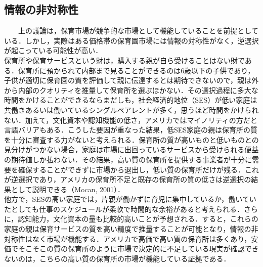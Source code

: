 \documentclass[
]{ltjarticle}
\begin{document}
\hypertarget{ux60c5ux5831ux306eux975eux5bfeux79f0ux6027}{%
\subsection{情報の非対称性}\label{ux60c5ux5831ux306eux975eux5bfeux79f0ux6027}}

~~~~上の議論は，保育市場が競争的な市場として機能していることを前提としている．しかし，実際はある価格帯の保育園市場には情報の対称性がなく，逆選択が起こっている可能性が高い．\\
\hspace*{0.333em}\hspace*{0.333em}\hspace*{0.333em}\hspace*{0.333em}保育所や保育サービスという財は，購入する親が自ら受けることはない財である．保育所に預かられて内部まで見ることができるのは6歳以下の子供であり，子供が適切に保育園の質を評価して親に伝達するとは期待できないので，親は外から内部のクオリティを推量して保育所を選ぶほかない．その選択過程に多大な時間をかけることができるならまだしも，社会経済的地位（SES）が低い家庭は共働きあるいは働いているシングルペアレントが多く，思うほど時間をかけられない．加えて，文化資本や認知機能の低さ，アメリカではマイノリティの方だと言語バリアもある．こうした要因が重なった結果，低SES家庭の親は保育所の質を十分に審査する力がないと考えられる．保育所の質が高いものと低いものとの見分けがつかない場合，家庭は市場に出回っているサービスから受けられる便益の期待値しか払わない．その結果，高い質の保育所を提供する事業者が十分に需要を確保することができずに市場から退出し，低い質の保育所だけが残る．これが逆選択であり，アメリカの保育所不足と既存の保育所の質の低さは逆選択の結果として説明できる（Mocan,
2001）．\\
\hspace*{0.333em}\hspace*{0.333em}\hspace*{0.333em}\hspace*{0.333em}他方で，SESの高い家庭では，片親が働かずに育児に集中しているか，働いていたとしても仕事のスケジュールが柔軟で時間的な余裕があると考えられる．さらに，認知能力，文化資本の量も比較的高いことが予想される．すると，これらの家庭の親は保育サービスの質を高い精度で推量することが可能となり，情報の非対称性はなく市場が機能する．アメリカで高価で高い質の保育所は多くあり，安価でそこそこの質の保育所のように市場で決定的に不足している現実が確認できないのは，こちらの高い質の保育所の市場が機能している証拠である．\\
\end{document}
